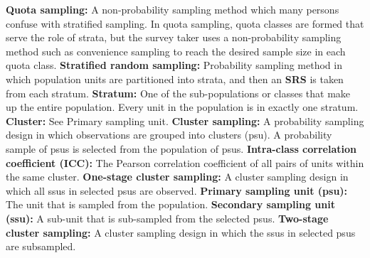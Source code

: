 \documentclass[a4paper,twoside,11pt]{article}
\begin{document}
\newline
\newline
\textbf{Quota sampling:} A non-probability sampling method which many persons confuse with stratified sampling. In quota sampling, quota classes are formed that serve the role of strata, but the survey taker uses a non-probability sampling method such as convenience sampling to reach the desired sample size in each quota class.
\newline
\newline
\textbf{Stratified random sampling:} Probability sampling method in which population units are partitioned into strata, and then an \textbf{SRS} is taken from each stratum.
\newline
\newline
\textbf{Stratum:} One of the sub-populations or classes that make up the entire population. Every unit in the population is in exactly one stratum.
\newline
\newline
\textbf{Cluster:} See Primary sampling unit.
\newline
\newline
\textbf{Cluster sampling:} A probability sampling design in which observations are grouped into clusters (psu). A probability sample of psus is selected from the population of psus.
\newline
\newline
\textbf{Intra-class correlation coefficient (ICC):} The Pearson correlation coefficient of all pairs of units within the same cluster.
\newline
\newline
\textbf{One-stage cluster sampling:} A cluster sampling design in which all ssus in selected psus are observed.
\newline
\newline
\textbf{Primary sampling unit (psu):} The unit that is sampled from the population. 
\newline
\newline
\textbf{Secondary sampling unit (ssu):} A sub-unit that is sub-sampled from the selected psus.
\newline
\newline
\textbf{Two-stage cluster sampling:} A cluster sampling design in which the ssus in selected psus are subsampled.
\end{document}
